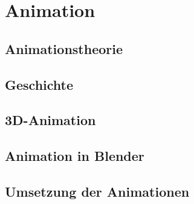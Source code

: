 \section{Animation}
\subsection{Animationstheorie}
\subsection{Geschichte}
\subsection{3D-Animation}
\subsection{Animation in Blender}
\subsection{Umsetzung der Animationen}